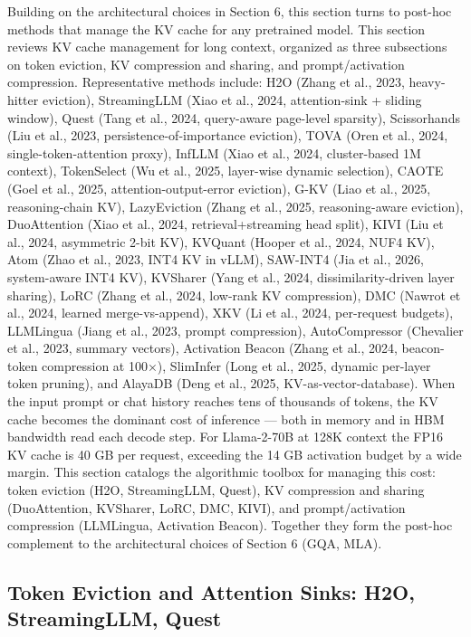 Building on the architectural choices in Section 6, this section turns to post-hoc methods that manage the KV cache for any pretrained model. This section reviews KV cache management for long context, organized as three subsections on token eviction, KV compression and sharing, and prompt/activation compression. Representative methods include: H2O (Zhang et al., 2023, heavy-hitter eviction), StreamingLLM (Xiao et al., 2024, attention-sink + sliding window), Quest (Tang et al., 2024, query-aware page-level sparsity), Scissorhands (Liu et al., 2023, persistence-of-importance eviction), TOVA (Oren et al., 2024, single-token-attention proxy), InfLLM (Xiao et al., 2024, cluster-based 1M context), TokenSelect (Wu et al., 2025, layer-wise dynamic selection), CAOTE (Goel et al., 2025, attention-output-error eviction), G-KV (Liao et al., 2025, reasoning-chain KV), LazyEviction (Zhang et al., 2025, reasoning-aware eviction), DuoAttention (Xiao et al., 2024, retrieval+streaming head split), KIVI (Liu et al., 2024, asymmetric 2-bit KV), KVQuant (Hooper et al., 2024, NUF4 KV), Atom (Zhao et al., 2023, INT4 KV in vLLM), SAW-INT4 (Jia et al., 2026, system-aware INT4 KV), KVSharer (Yang et al., 2024, dissimilarity-driven layer sharing), LoRC (Zhang et al., 2024, low-rank KV compression), DMC (Nawrot et al., 2024, learned merge-vs-append), XKV (Li et al., 2024, per-request budgets), LLMLingua (Jiang et al., 2023, prompt compression), AutoCompressor (Chevalier et al., 2023, summary vectors), Activation Beacon (Zhang et al., 2024, beacon-token compression at 100×), SlimInfer (Long et al., 2025, dynamic per-layer token pruning), and AlayaDB (Deng et al., 2025, KV-as-vector-database). When the input prompt or chat history reaches tens of thousands of tokens, the KV cache becomes the dominant cost of inference --- both in memory and in HBM bandwidth read each decode step. For Llama-2-70B at 128K context the FP16 KV cache is 40 GB per request, exceeding the 14 GB activation budget by a wide margin. This section catalogs the algorithmic toolbox for managing this cost: token eviction (H2O, StreamingLLM, Quest), KV compression and sharing (DuoAttention, KVSharer, LoRC, DMC, KIVI), and prompt/activation compression (LLMLingua, Activation Beacon). Together they form the post-hoc complement to the architectural choices of Section 6 (GQA, MLA).

\subsection{Token Eviction and Attention Sinks: H2O, StreamingLLM, Quest}\label{token-eviction-and-attention-sinks-h2o-streamingllm-quest}

